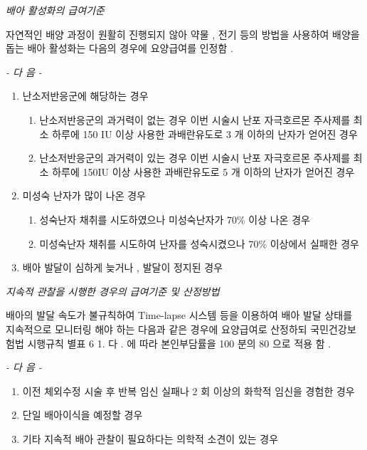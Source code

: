 {\par
\emph{배아 활성화의 급여기준}\par
자연적인 배양 과정이 원활히 진행되지 않아 약물 ,  전기 등의  방법을 사용하여 배양을 돕는 배아 활성화는  다음의 경우에 요양급여를 인정함 . \par
\emph{-  다 음  -}\par  
\begin{enumerate}[가.]\tightlist
\item 난소저반응군에 해당하는 경우 
	\begin{enumerate}[1)]\tightlist
	\item 난소저반응군의 과거력이 없는 경우 이번 시술시 난포 자극호르몬 주사제를 최소 하루에  150 IU  이상 사용한  과배란유도로  3 개 이하의 난자가 얻어진 경우 
	\item 난소저반응군의 과거력이 있는 경우 이번 시술시 난포 자극호르몬 주사제를 최소 하루에  150IU  이상 사용한 과배란유도로  5 개 이하의 난자가 얻어진 경우 
	\end{enumerate}
\item 미성숙 난자가 많이 나온 경우 
	\begin{enumerate}[1)]\tightlist
	\item 성숙난자 채취를 시도하였으나 미성숙난자가  70\%  이상 나온 경우 
	\item 미성숙난자 채취를 시도하여 난자를 성숙시켰으나  70\%  이상에서 실패한 경우 
	\end{enumerate}
\item 배아 발달이 심하게 늦거나 ,  발달이 정지된 경우 
\end{enumerate} 

\emph{지속적 관찰을 시행한 경우의 급여기준 및 산정방법} \par
배아의 발달 속도가 불규칙하여  Time-lapse  시스템 등을 이용하여 배아 발달 상태를 지속적으로 모니터링 해야 하는 다음과  같은 경우에 요양급여로 산정하되 국민건강보험법 시행규칙 별표 6 1. 다 . 에  따라 본인부담률을  100 분의  80 으로 적용 함 . \par
\emph{-  다 음  -}\par 
\begin{enumerate}[가.]\tightlist
\item 이전 체외수정 시술 후 반복 임신 실패나  2 회 이상의 화학적  임신을 경험한 경우 
\item 단일 배아이식을 예정할 경우 
\item 기타 지속적 배아 관찰이 필요하다는 의학적 소견이 있는 경우 
\end{enumerate} 

}

